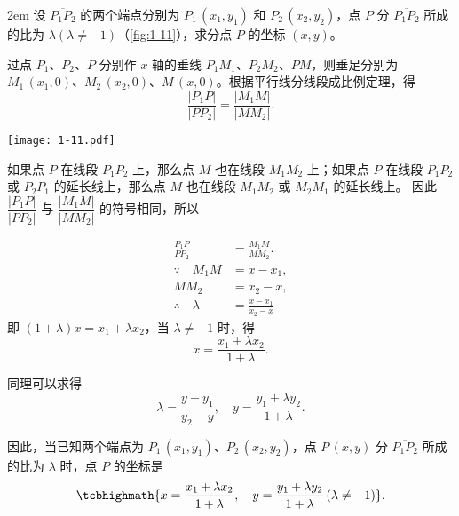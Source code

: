\medskip\noindent
\begin{minipage}{0.58\linewidth}\parindent2em
设 $\overline{P_1P_2}$ 的两个端点分别为 $P_1\,(x_1,y_1)$ 和 $P_2\,(x_2,y_2)$，点 $P$ 分 $\overline{P_1P_2}$ 所成的比为 $\lambda(\lambda\neq-1)$（\cref{fig:1-11}），求分点 $P$ 的坐标 $(x,y)$。

过点 $P_1$、$P_2$、$P$ 分别作 $x$ 轴的垂线 $P_1M_1$、$P_2M_2$、$PM$，则垂足分别为 $M_1\,(x_1,0)$、$M_2\,(x_2,0)$、$M\,(x,0)$。根据平行线分线段成比例定理，得
\[ \frac{|P_1P|}{|PP_2|}=\frac{|M_1M|}{|MM_2|}. \]
\end{minipage}\hfill
\begin{minipage}{0.37\linewidth}\centering
\begin{figurehere}
  \texttt{[image: 1-11.pdf]}
  \caption{}\label{fig:1-11}
\end{figurehere}
\end{minipage}

\medskip
{\linespread{1.6}\selectfont 如果点 $P$ 在线段 $P_1P_2$ 上，那么点 $M$ 也在线段 $M_1M_2$ 上；如果点 $P$ 在线段 $P_1P_2$ 或 $P_2P_1$ 的延长线上，那么点 $M$ 也在线段 $M_1M_2$ 或 $M_2M_1$ 的延长线上。
因此 $\dfrac{|P_1P|}{|PP_2|}$ 与 $\dfrac{|M_1M|}{|MM_2|}$ 的符号相同，所以\par}
\begin{align*}
  \frac{P_1P}{PP_2}&=\frac{M_1M}{MM_2}.\\
  \because \quad M_1M&=x-x_1, \\
  MM_2&=x_2-x, \\
  \therefore \quad \lambda&=\frac{x-x_1}{x_2-x} 
\end{align*}
即 $(1+\lambda)x=x_1+\lambda x_2$，当 $\lambda\neq -1$ 时，得
\[ x= \frac{x_1+\lambda x_2}{1+\lambda}.\]

同理可以求得
\[ \lambda=\frac{y-y_1}{y_2-y}, \quad y=\frac{y_1+\lambda y_2}{1+\lambda}.\]

因此，当已知两个端点为 $P_1\,(x_1,y_1)$、$P_2\,(x_2,y_2)$，点 $P\,(x,y)$ 分 $\overline{P_1P_2}$ 所成的比为 $\lambda$ 时，点 $P$ 的坐标是
\[ \tcbhighmath{x= \frac{x_1+\lambda x_2}{1+\lambda}, \quad y=\frac{y_1+\lambda y_2}{1+\lambda}\,(\lambda\neq-1)}.\]

